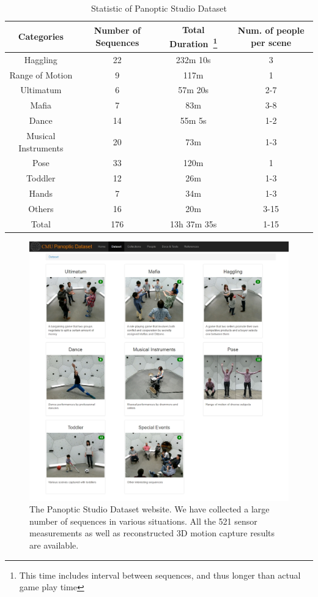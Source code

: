 \begin{table}[h]
	\centering
	\begin{tabular}{c| c | c | c }
		\hline	
		Categories & Number of Sequences  & Total Duration~\footnote{This time includes interval between sequences, and thus longer than actual game play time}  & Num. of people per scene \\
		\hline	
		Haggling & 22  & 232m 10s  & 3   \\
		\hline	
		Range of Motion &  9 & 117m  & 1   \\
		\hline	
		Ultimatum &  6 & 57m 20s & 2-7   \\
		\hline	
		Mafia &  7 &  83m & 3-8   \\
		\hline	
		Dance&  14& 55m 5s & 1-2   \\
		\hline	
		Musical Instruments& 20 & 73m  & 1-3  \\
		\hline	
		Pose& 33 & 120m  & 1  \\ 
		\hline	
		Toddler& 12 & 26m & 1-3  \\ 
		\hline	
		Hands&  7 &  34m & 1-3  \\ 
		\hline	
		Others& 16 & 20m & 3-15 \\
		\hline	
		\hline	
		Total& 176 & 13h 37m 35s & 1-15\\
		\hline	
	\end{tabular}
	\caption{Statistic of Panoptic Studio Dataset}
	\label{table:dataset}
\end{table}

\begin{figure}
	\centering
	\includegraphics[height=0.95\textwidth]{figures/domedb}
	\caption{The Panoptic Studio Dataset website. We have collected a large number of sequences in various situations. All the 521 sensor measurements as well as reconstructed 3D motion capture results are available.} 
	\label{fig:domedb}
\end{figure}

